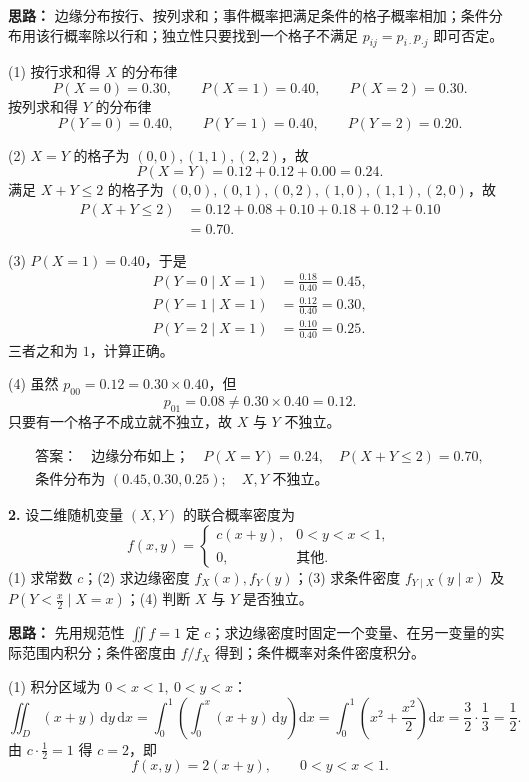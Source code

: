 \ifshowsolutions%
\textbf{思路：} 边缘分布按行、按列求和；事件概率把满足条件的格子概率相加；条件分布用该行概率除以行和；独立性只要找到一个格子不满足 $p_{ij}=p_{i\cdot}p_{\cdot j}$ 即可否定。

(1) 按行求和得 $X$ 的分布律
\[
P(X=0)=0.30,\qquad P(X=1)=0.40,\qquad P(X=2)=0.30.
\]
按列求和得 $Y$ 的分布律
\[
P(Y=0)=0.40,\qquad P(Y=1)=0.40,\qquad P(Y=2)=0.20.
\]

(2) $X=Y$ 的格子为 $(0,0),(1,1),(2,2)$，故
\[
P(X=Y)=0.12+0.12+0.00=0.24.
\]
满足 $X+Y\leq 2$ 的格子为 $(0,0),(0,1),(0,2),(1,0),(1,1),(2,0)$，故
\[
\begin{aligned}
P(X+Y\leq 2)&=0.12+0.08+0.10+0.18+0.12+0.10\\
&=0.70.
\end{aligned}
\]

(3) $P(X=1)=0.40$，于是
\[
\begin{aligned}
P(Y=0\mid X=1)&=\frac{0.18}{0.40}=0.45,\\
P(Y=1\mid X=1)&=\frac{0.12}{0.40}=0.30,\\
P(Y=2\mid X=1)&=\frac{0.10}{0.40}=0.25.
\end{aligned}
\]
三者之和为 $1$，计算正确。

(4) 虽然 $p_{00}=0.12=0.30\times0.40$，但
\[
p_{01}=0.08\neq 0.30\times0.40=0.12.
\]
只要有一个格子不成立就不独立，故 $X$ 与 $Y$ 不独立。

\[
\boxed{\begin{gathered}
\textbf{答案：}\quad \text{边缘分布如上；}\quad P(X=Y)=0.24,\quad P(X+Y\leq2)=0.70,\\
\text{条件分布为 }(0.45,0.30,0.25);\quad X,Y\text{ 不独立。}
\end{gathered}}
\]

\else \answerarea[10] \fi%
\textbf{2.} 设二维随机变量 $(X,Y)$ 的联合概率密度为
\[
f(x,y)=\begin{cases}
c(x+y), & 0<y<x<1,\\
0, & \text{其他}.
\end{cases}
\]
(1) 求常数 $c$；(2) 求边缘密度 $f_X(x),f_Y(y)$；(3) 求条件密度 $f_{Y\mid X}(y\mid x)$ 及 $P\!\left(Y<\frac{x}{2}\mid X=x\right)$；(4) 判断 $X$ 与 $Y$ 是否独立。

\ifshowsolutions%
\textbf{思路：} 先用规范性 $\iint f=1$ 定 $c$；求边缘密度时固定一个变量、在另一变量的实际范围内积分；条件密度由 $f/f_X$ 得到；条件概率对条件密度积分。

(1) 积分区域为 $0<x<1,\ 0<y<x$：
\[
\iint_D (x+y)\,\mathrm dy\,\mathrm dx
=\int_0^1\left(\int_0^x (x+y)\,\mathrm dy\right)\mathrm dx
=\int_0^1\left(x^2+\frac{x^2}{2}\right)\mathrm dx
=\frac32\cdot\frac13=\frac12.
\]
由 $c\cdot\frac12=1$ 得 $c=2$，即
\[
f(x,y)=2(x+y),\qquad 0<y<x<1.
\]

